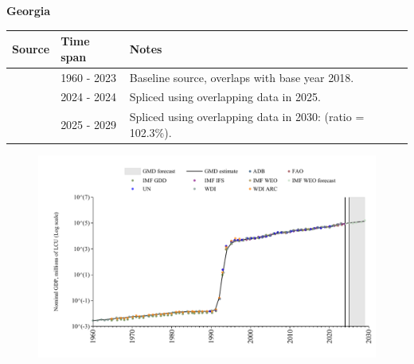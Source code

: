 \documentclass[12pt,a4paper,landscape]{article}
\begin{document}
\begin{adjustbox}{max totalsize={\paperwidth}{\paperheight},center}
\begin{minipage}[t][\textheight][t]{\textwidth}
\vspace*{0.5cm}
{}
\begin{center}
{\Large\bfseries Georgia}
\end{center}
\vspace{0.5cm}
\begin{table}[H]
\centering
\small
\begin{tabular}{|l|l|l|}
\hline
\textbf{Source} & \textbf{Time span} & \textbf{Notes} \\
\hline
\rowcolor{white}\cite{WDI}& 1960 - 2023 &Baseline source, overlaps with base year 2018.\\
\rowcolor{lightgray}\cite{IMF_IFS}& 2024 - 2024 &Spliced using overlapping data in 2025.\\
\rowcolor{white}\cite{IMF_WEO_forecast}& 2025 - 2029 &Spliced using overlapping data in 2030: (ratio = 102.3\%).\\
\hline
\end{tabular}
\end{table}
\begin{figure}[H]
\centering
\includegraphics[width=\textwidth,height=0.6\textheight,keepaspectratio]{graphs/GEO_nGDP.pdf}
\end{figure}
\end{minipage}
\end{adjustbox}
\end{document}
